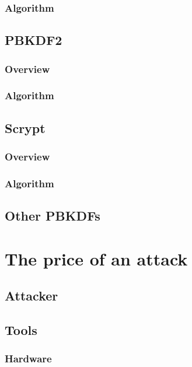 \documentclass[nolof]{fithesis3}
\begin{document}
\subsection{Algorithm}

\section{PBKDF2}
\label{sec:pbkdf2}

\subsection{Overview}

\subsection{Algorithm}

\section{Scrypt}

\subsection{Overview}

\subsection{Algorithm}

\section{Other PBKDFs}

\chapter{The price of an attack}

\section{Attacker}

\section{Tools}

\subsection{Hardware}
\end{document}
